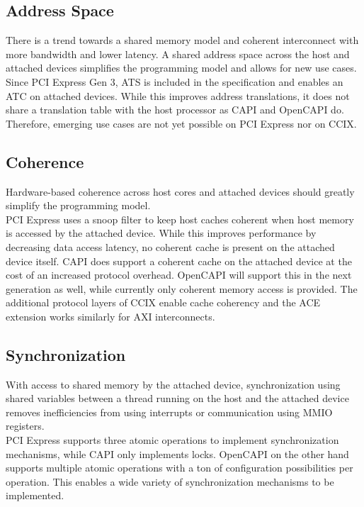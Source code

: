 \subsection{Address Space}
There is a trend towards a shared memory model and coherent interconnect with more bandwidth and lower latency. A shared address space across the host and attached devices simplifies the programming model and allows for new use cases.\\
Since PCI Express Gen 3, ATS is included in the specification and enables an ATC on attached devices. While this improves address translations, it does not share a translation table with the host processor as CAPI and OpenCAPI do. Therefore, emerging use cases are not yet possible on PCI Express nor on CCIX.



\subsection{Coherence}
Hardware-based coherence across host cores and attached devices should greatly simplify the programming model.\\
PCI Express uses a snoop filter to keep host caches coherent when host memory is accessed by the attached device. While this improves performance by decreasing data access latency, no coherent cache is present on the attached device itself. CAPI does support a coherent cache on the attached device at the cost of an increased protocol overhead. OpenCAPI will support this in the next generation as well, while currently only coherent memory access is provided. The additional protocol layers of CCIX enable cache coherency and the ACE extension works similarly for AXI interconnects.



\subsection{Synchronization}
With access to shared memory by the attached device, synchronization using shared variables between a thread running on the host and the attached device removes inefficiencies from using interrupts or communication using MMIO registers.\\
PCI Express supports three atomic operations to implement synchronization mechanisms, while CAPI only implements locks. OpenCAPI on the other hand supports multiple atomic operations with a ton of configuration possibilities per operation. This enables a wide variety of synchronization mechanisms to be implemented.


